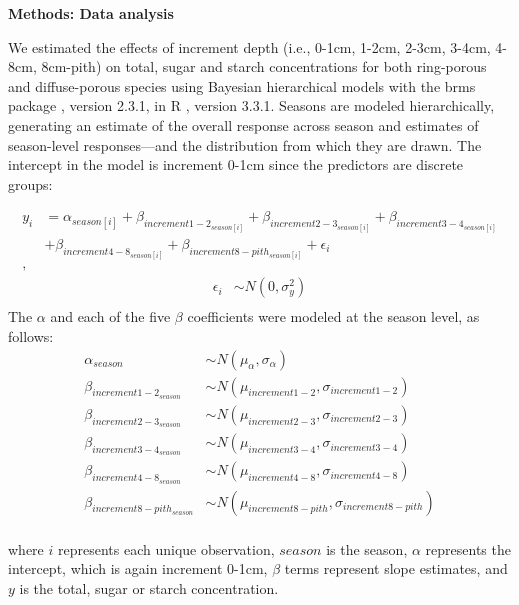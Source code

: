 \documentclass{article}\usepackage[]{graphicx}\usepackage[]{color}
\begin{document}
\noindent 
\renewcommand{\thetable}{S\arabic{table}}
\renewcommand{\thefigure}{S\arabic{figure}}

\textbf{\LARGE{Methods: Data analysis}}

\par We estimated the effects of increment depth (i.e., 0-1cm, 1-2cm, 2-3cm, 3-4cm, 4-8cm, 8cm-pith) on total, sugar and starch concentrations for both ring-porous and diffuse-porous species using Bayesian hierarchical models with the brms package \citep{brms}, version 2.3.1,  in R \citep{R}, version 3.3.1. Seasons are modeled hierarchically, generating an estimate of the overall response across season and estimates of season-level responses---and the distribution from which they are drawn. The intercept in the model is increment 0-1cm since the predictors are discrete groups:  

\begin{align*}
y_i &= \alpha_{season[i]} + \beta_{increment1-2_{season[i]}} + \beta_{increment2-3_{season[i]}} + \beta_{increment3-4_{season[i]}}\\
&+ \beta_{increment4-8_{season[i]}} + \beta_{increment8-pith_{season[i]}} + \epsilon_i\\,
\end{align*}
\begin{align*}
\epsilon_i & \sim N(0,\sigma^2_y) \\
\end{align*}
\noindent The $\alpha$ and each of the five $\beta$ coefficients were modeled at the season level, as follows:
\begin{align*}
\alpha_{season} & \sim N(\mu_{\alpha}, \sigma_{\alpha}) \\
\beta_{increment1-2_{season}} & \sim N(\mu_{increment1-2}, \sigma_{increment1-2}) \\
\beta_{increment2-3_{season}} & \sim N(\mu_{increment2-3}, \sigma_{increment2-3}) \\
\beta_{increment3-4_{season}} & \sim N(\mu_{increment3-4}, \sigma_{increment3-4}) \\
\beta_{increment4-8_{season}} & \sim N(\mu_{increment4-8}, \sigma_{increment4-8}) \\
\beta_{increment8-pith_{season}} & \sim N(\mu_{increment8-pith}, \sigma_{increment8-pith}) \\
\end{align*}

where $i$ represents each unique observation, $season$ is the season, $\alpha$ represents the intercept, which is again increment 0-1cm, $\beta$ terms represent slope estimates, and $y$ is the total, sugar or starch concentration. 
\end{document}
